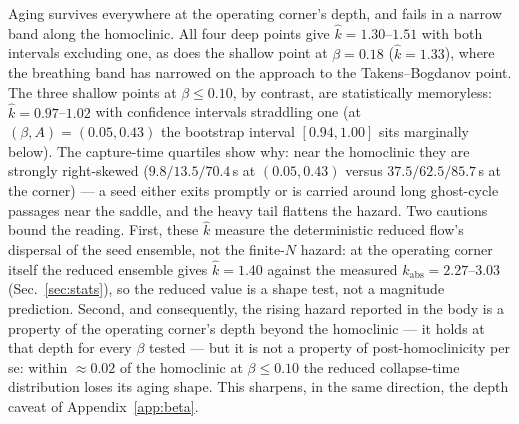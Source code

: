 \documentclass[pdflatex,sn-mathphys,Numbered]{sn-jnl}
\begin{document}
\begin{appendices}
Aging survives everywhere at the operating corner's depth, and fails in a
narrow band along the homoclinic. All four deep points give
$\hat k = 1.30$--$1.51$ with both intervals excluding one, as does the shallow
point at $\beta = 0.18$ ($\hat k = 1.33$), where the breathing band has
narrowed on the approach to the Takens--Bogdanov point. The three shallow
points at $\beta \le 0.10$, by contrast, are statistically memoryless:
$\hat k = 0.97$--$1.02$ with confidence intervals straddling one (at
$(\beta, A) = (0.05, 0.43)$ the bootstrap interval $[0.94, 1.00]$ sits
marginally below). The capture-time quartiles show why: near the homoclinic
they are strongly right-skewed ($9.8/13.5/70.4$\,s at $(0.05, 0.43)$ versus
$37.5/62.5/85.7$\,s at the corner) --- a seed either exits promptly or is
carried around long ghost-cycle passages near the saddle, and the heavy tail
flattens the hazard. Two cautions bound the reading. First, these $\hat k$
measure the deterministic reduced flow's dispersal of the seed ensemble, not
the finite-$N$ hazard: at the operating corner itself the reduced ensemble
gives $\hat k = 1.40$ against the measured $k_{\mathrm{abs}} = 2.27$--$3.03$
(Sec.~\ref{sec:stats}), so the reduced value is a shape test, not a magnitude
prediction. Second, and consequently, the rising hazard reported in the body
is a property of the operating corner's depth beyond the homoclinic --- it
holds at that depth for every $\beta$ tested --- but it is not a property of
post-homoclinicity per se: within ${\approx}0.02$ of the homoclinic at
$\beta \le 0.10$ the reduced collapse-time distribution loses its aging shape.
This sharpens, in the same direction, the depth caveat of
Appendix~\ref{app:beta}.


\end{appendices}
\end{document}
